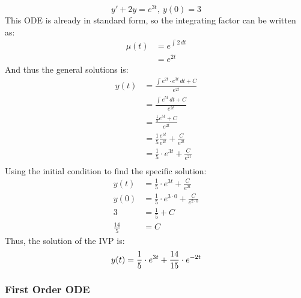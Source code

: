 \documentclass[12pt]{article}
\begin{document}
\begin{example}
  \begin{equation*}
    y' + 2y = e^{3t},\ y(0) = 3
  \end{equation*}
  This ODE is already in standard form, so the integrating factor can be written as:
  \begin{align*}
    \mu(t) &= e^{\int_{}^{} 2 \,dt} \\
           &= e^{2t}
  \end{align*}
  And thus the general solutions is:
  \begin{align*}
    y(t) &= \frac{\int_{}^{} e^{2t} \cdot e^{3t} \,dt + C}{e^{2t}} \\
         &= \frac{\int_{}^{} e^{5t} \,dt + C}{e^{2t}} \\
         &= \frac{\frac{1}{5} e^{5t} + C}{e^{2t}} \\
         &= \frac{1}{5} \frac{e^{5t}}{e^{2t}} + \frac{C}{e^{2t}} \\
         &= \frac{1}{5} \cdot e^{3t} + \frac{C}{e^{2t}} \\
  \end{align*}
  Using the initial condition to find the specific solution:
  \begin{align*}
    y(t) &= \frac{1}{5} \cdot e^{3t} + \frac{C}{e^{2t}} \\
    y(0) &= \frac{1}{5} \cdot e^{3 \cdot 0} + \frac{C}{e^{2 \cdot 0}} \\
    3    &= \frac{1}{5} + C \\
    \frac{14}{5} &= C
  \end{align*}
  Thus, the solution of the IVP is:
  \begin{equation*}
    y(t) = \frac{1}{5} \cdot e^{3t} + \frac{14}{15} \cdot e^{-2t} \\
  \end{equation*}
\end{example}

\subsubsection{First Order ODE}
\label{sssec:firstOrderODE}
\end{document}
